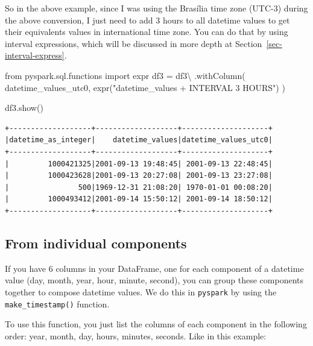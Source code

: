 \documentclass[
  11pt,
  letterpaper,
  DIV=11,
  numbers=noendperiod]{scrreprt}
\newenvironment{Shaded}{\begin{snugshade}}{\end{snugshade}}
\newcommand{\ImportTok}[1]{\textcolor[rgb]{0.00,0.46,0.62}{#1}}
\newcommand{\NormalTok}[1]{\textcolor[rgb]{0.00,0.23,0.31}{#1}}
\newcommand{\OperatorTok}[1]{\textcolor[rgb]{0.37,0.37,0.37}{#1}}
\newcommand{\StringTok}[1]{\textcolor[rgb]{0.13,0.47,0.30}{#1}}
\begin{document}
So in the above example, since I was using the Brasília time zone
(UTC-3) during the above conversion, I just need to add 3 hours to all
datetime values to get their equivalents values in international time
zone. You can do that by using interval expressions, which will be
discussed in more depth at Section~\ref{sec-interval-express}.

\begin{Shaded}
\begin{Highlighting}[]
\ImportTok{from}\NormalTok{ pyspark.sql.functions }\ImportTok{import}\NormalTok{ expr}
\NormalTok{df3 }\OperatorTok{=}\NormalTok{ df3}\OperatorTok{\textbackslash{}}
\NormalTok{    .withColumn(}
        \StringTok{\textquotesingle{}datetime\_values\_utc0\textquotesingle{}}\NormalTok{,}
\NormalTok{        expr(}\StringTok{"datetime\_values + INTERVAL 3 HOURS"}\NormalTok{)}
\NormalTok{    )}

\NormalTok{df3.show()}
\end{Highlighting}
\end{Shaded}

\begin{verbatim}
+-------------------+-------------------+--------------------+
|datetime_as_integer|    datetime_values|datetime_values_utc0|
+-------------------+-------------------+--------------------+
|         1000421325|2001-09-13 19:48:45| 2001-09-13 22:48:45|
|         1000423628|2001-09-13 20:27:08| 2001-09-13 23:27:08|
|                500|1969-12-31 21:08:20| 1970-01-01 00:08:20|
|         1000493412|2001-09-14 15:50:12| 2001-09-14 18:50:12|
+-------------------+-------------------+--------------------+
\end{verbatim}

\hypertarget{from-individual-components-1}{%
\subsection{From individual
components}\label{from-individual-components-1}}

If you have 6 columns in your DataFrame, one for each component of a
datetime value (day, month, year, hour, minute, second), you can group
these components together to compose datetime values. We do this in
\texttt{pyspark} by using the \texttt{make\_timestamp()} function.

To use this function, you just list the columns of each component in the
following order: year, month, day, hours, minutes, seconds. Like in this
example:
\end{document}
